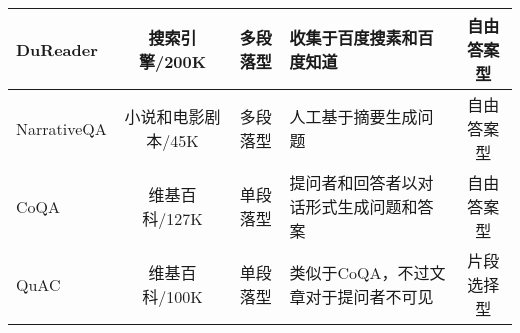 \begin{table}[ht]
{\begin{tabular}{l c c p{6cm}<{\centering} c}
			\midrule
			DuReader\upcite{DuReader}&搜索引擎/200K&多段落型&收集于百度搜素和百度知道&自由答案型\\
			\midrule
			NarrativeQA\upcite{NarrativeQA}&小说和电影剧本/45K&多段落型&人工基于摘要生成问题&自由答案型\\
			\midrule
			CoQA\upcite{CoQA}&维基百科/127K&单段落型&提问者和回答者以对话形式生成问题和答案&自由答案型\\
			\midrule
			QuAC\upcite{QuAC}&维基百科/100K&单段落型&类似于CoQA，不过文章对于提问者不可见&片段选择型\\
			\bottomrule
		\end{tabular}
	}
\end{table}



